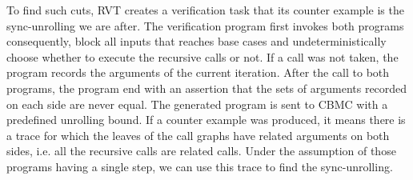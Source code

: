 To find such cuts, RVT creates a verification task that its counter example is the sync-unrolling we are after. The verification program first invokes both programs consequently, block all inputs that reaches base cases and undeterministically choose whether to execute the recursive calls or not. If a call was not taken, the program records the arguments of the current iteration. After the call to both programs, the program end with an assertion that the sets of arguments recorded on each side are never equal. The generated program is sent to CBMC with a predefined unrolling bound. If a counter example was produced, it means there is a trace for which the leaves of the call graphs have related arguments on both sides, i.e. all the recursive calls are related calls. Under the assumption of those programs having a single step, we can use this trace to find the sync-unrolling. 
